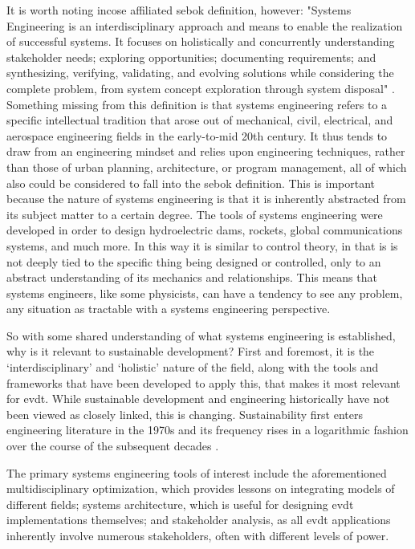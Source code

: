 It is worth noting \ac{incose} affiliated \ac{sebok} definition, however: "Systems Engineering is an interdisciplinary approach and means to enable the realization of successful systems. It focuses on holistically and concurrently understanding stakeholder needs; exploring opportunities; documenting requirements; and synthesizing, verifying, validating, and evolving solutions while considering the complete problem, from system concept exploration through system disposal" \cite{systemsengineeringbodyofknowledgeSystemsEngineeringGlossary2021}. Something missing from this definition is that systems engineering refers to a specific intellectual tradition that arose out of mechanical, civil, electrical, and aerospace engineering fields in the early-to-mid 20th century. It thus tends to draw from an engineering mindset and relies upon engineering techniques, rather than those of urban planning, architecture, or program management, all of which also could be considered to fall into the \ac{sebok} definition. This is important because the nature of systems engineering is that it is inherently abstracted from its subject matter to a certain degree. The tools of systems engineering were developed in order to design hydroelectric dams, rockets, global communications systems, and much more. In this way it is similar to control theory, in that is is not deeply tied to the specific thing being designed or controlled, only to an abstract understanding of its mechanics and relationships. This means that systems engineers, like some physicists, can have a tendency to see any problem, any situation as tractable with a systems engineering perspective.

So with some shared understanding of what systems engineering is established, why is it relevant to sustainable development? First and foremost, it is the `interdisciplinary' and `holistic' nature of the field, along with the tools and frameworks that have been developed to apply this, that makes it most relevant for \ac{evdt}. While sustainable development and engineering historically have not been viewed as closely linked, this is changing. Sustainability first enters engineering literature in the 1970s and its frequency rises in a logarithmic fashion over the course of the subsequent decades \cite{deweckInvestigatingRelationshipsSemantic2012}.

The primary systems engineering tools of interest include the aforementioned multidisciplinary optimization, which provides lessons on integrating models of different fields; systems architecture, which is useful for designing \ac{evdt} implementations themselves; and stakeholder analysis, as all \ac{evdt} applications inherently involve numerous stakeholders, often with different levels of power. 

